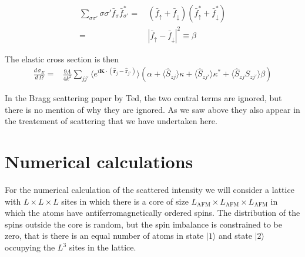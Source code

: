 \documentclass[11pt,letter]{article}
\newcommand{\bv}[1]{\ensuremath{\bm{#1}}}
\newcommand{\dsig}[1]{\ensuremath{ \frac{ d\,\sigma_{#1} }{d\,\Omega} }}
\begin{document}
\begin{equation}
\begin{split}
\sum_{\sigma\sigma'} \sigma\sigma' \bar{f}_{\sigma} \bar{f}_{\sigma'}^{*} = &\,
            (\bar{f}_{\uparrow} + \bar{f}_{\downarrow})( \bar{f}_{\uparrow}^{*} + \bar{f}_{\downarrow}^{*} ) \\
       =&\, | \bar{f}_{\uparrow} - \bar{f}_{\downarrow} | ^{2} \equiv \beta
\end{split}
\end{equation}

The elastic cross section is then
\begin{equation}
\begin{split}
\dsig{E} =& \frac{9\Lambda}{4k^{2}}
               \sum_{ j j' } \langle
              e^{ i \bv{K} \cdot ( \hat{\bv{r}}_{j} - \hat{\bv{r}}_{j'} ) } \rangle
             \left( \alpha + \langle \hat{S}_{zj}\rangle \kappa + \langle \hat{S}_{zj'} \rangle \kappa^{*}
                     + \langle \hat{S}_{zj} \hat{S}_{zj'} \rangle \beta \right)
\end{split}
\end{equation}

In the Bragg scattering paper by Ted, the two central terms are ignored, but there is no mention of why they are ignored.  As we saw above they also appear in the treatement of scattering that we have undertaken here.  


\section{Numerical calculations}

For the numerical calculation of the scattered intensity we will consider a
lattice with $L\times L\times L$ sites in which there is a core of size
$L_{\mathrm{AFM}} \times L_{\mathrm{AFM}} \times L_{\mathrm{AFM}}$ in which the
atoms have antiferromagnetically ordered spins.   The distribution of the spins
outside the core is random, but the spin imbalance is constrained to be zero,
that is there is an equal number of atoms in state $|1\rangle$ and state
$|2\rangle $  occupying the $L^{3}$ sites in the lattice. 
\end{document}
